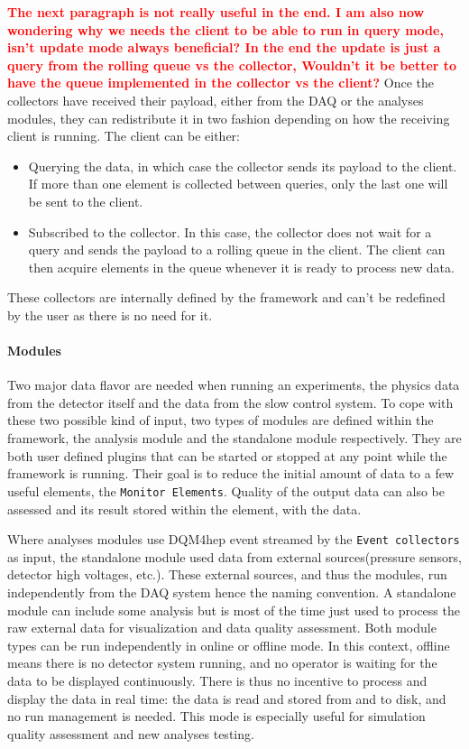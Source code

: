 \documentclass{webofc}
\begin{document}
\textcolor{red}{\textbf{The next paragraph is not really useful in the end. I am also now wondering why we needs the client to be able to run in query mode, isn't update mode always beneficial? In the end the update is just a query from the rolling queue vs the collector, Wouldn't it be better to have the queue implemented in the collector vs the client?}}
Once the collectors have received their payload, either from the DAQ or the analyses modules, they can redistribute it in two fashion depending on how the receiving client is running. The client can be either:

\begin{itemize}
  \item Querying the data, in which case the collector sends its payload to the client. If more than one element is collected between queries, only the last one will be sent to the client.
  \item Subscribed to the collector. In this case, the collector does not wait for a query and sends the payload to a rolling queue in the client. The client can then acquire elements in the queue whenever it is ready to process new data.  
\end{itemize}

These collectors are internally defined by the framework and can't be redefined by the user as there is no need for it. 


\paragraph{Modules}\label{par:Modules}
Two major data flavor are needed when running an experiments, the physics data from the detector itself and the data from the slow control system.
To cope with these two possible kind of input, two types of modules are defined within the framework, the analysis module and the standalone module respectively.
They are both user defined plugins that can be started or stopped at any point while the framework is running.
Their goal is to reduce the initial amount of data to a few useful elements, the \texttt{Monitor Elements}.
Quality of the output data can also be assessed and its result stored within the element, with the data.

Where analyses modules use DQM4hep event streamed by the \texttt{Event collectors} as input, the standalone module 
used data from external sources(pressure sensors, detector high voltages, etc.).
These external sources, and thus the modules, run independently from the DAQ system hence the naming convention. 
A standalone module can include some analysis but is most of the time just used to process the raw external data for visualization and data quality assessment. 
Both module types can be run independently in online or offline mode. In this context, offline means there is no detector system running, and no operator is waiting for the data to be displayed continuously. There is thus no incentive to process and display the data in real time: the data is read and stored from and to disk, and no run management is needed. This mode is especially useful for simulation quality assessment and new analyses testing. 
\end{document}
